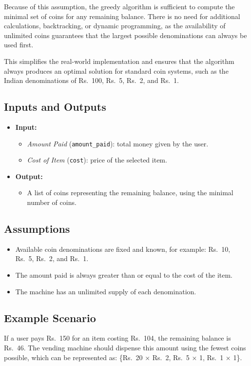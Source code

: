\documentclass[12pt,a4paper]{report}
\begin{document}
Because of this assumption, the greedy algorithm is sufficient to compute the minimal set of coins for any remaining balance. There is no need for additional calculations, backtracking, or dynamic programming, as the availability of unlimited coins guarantees that the largest possible denominations can always be used first.  

This simplifies the real-world implementation and ensures that the algorithm always produces an optimal solution for standard coin systems, such as the Indian denominations of  Rs.~100, Rs.~5,	 Rs.~2, and Rs.~1.

\subsection{Inputs and Outputs}
\begin{itemize}
    \item \textbf{Input:} 
    \begin{itemize}
        \item \textit{Amount Paid} (\texttt{amount\_paid}): total money given by the user.
        \item \textit{Cost of Item} (\texttt{cost}): price of the selected item.
    \end{itemize}
    \item \textbf{Output:} 
    \begin{itemize}
        \item A list of coins representing the remaining balance, using the minimal number of coins.
    \end{itemize}
\end{itemize}

\subsection{Assumptions}
\begin{itemize}
    \item Available coin denominations are fixed and known, for example: Rs.~10, Rs.~5, Rs.~2, and Rs.~1.
    \item The amount paid is always greater than or equal to the cost of the item.
    \item The machine has an unlimited supply of each denomination.
\end{itemize}

\subsection{Example Scenario}
If a user pays Rs.~150 for an item costing Rs.~104, the remaining balance is Rs.~46. The vending machine should dispense this amount using the fewest coins possible, which can be represented as: \{Rs.~20 × Rs.~2, Rs.~5 × 1, Rs.~1 × 1\}.
\end{document}
